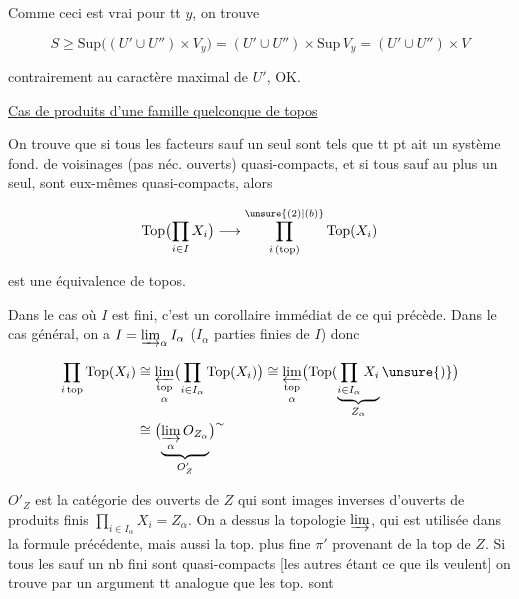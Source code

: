 Comme ceci est vrai pour tt $y$, on trouve

\[
S\geq\mathrm{Sup}\bigl((U'\cup U'')\times V_y\bigr)
 =(U'\cup U'')\times\mathrm{Sup}\,V_y=(U'\cup U'')\times V
\]

contrairement au caractère maximal de $U'$, OK.

\uline{Cas de produits  d'une famille quelconque de topos}

On trouve que si tous les facteurs sauf  un seul sont tels que tt pt ait un système fond. de voisinages (pas néc. ouverts) quasi-compacts, et si tous sauf au plus un seul, sont  eux-mêmes quasi-compacts, alors

\[
\mathrm{Top}\bigl(\prod_{i\in I}X_i\bigr)\longrightarrow\prod_{i\,(\mathrm{top})}^{\unsure{(2)|(b)}}\mathrm{Top}(X_i)
\]

est une équivalence de topos.


Dans le cas où $I$ est fini, c'est un corollaire immédiat de ce qui précède. Dans le cas général, on a $I=\varinjlim_\alpha I_\alpha$ ($I_\alpha$ parties finies de $I$) donc

\[
\begin{aligned}
\prod_{i\,\mathrm{top}}\mathrm{Top}(X_i)
 &\cong\mathop{\varprojlim_{\mathrm{top}}}_{\alpha}\bigl(\prod_{i\in I_\alpha}\mathrm{Top}(X_i)\bigr)
 \cong\mathop{\varprojlim_{\mathrm{top}}}_{\alpha}\bigl(\mathrm{Top}(\underbrace{\prod_{i\in I_\alpha}X_i}_{Z_\alpha}\unsure{)}\bigr)\\
 &\cong\bigl(\underbrace{\varinjlim_\alpha O_{Z_\alpha}}_{O'_Z}\bigr)^{\sim}
\end{aligned}
\]

$O'_Z$ est la catégorie des ouverts de $Z$  qui sont images inverses d'ouverts de produits finis $\prod_{i\in I_\alpha}X_i=Z_\alpha$.  On  a dessus la topologie  $\varinjlim$, qui  est utilisée dans la formule précédente, mais aussi la top. plus fine $\pi'$ provenant de la top de $Z$. Si tous les   sauf un nb fini sont quasi-compacts [les autres étant ce que ils veulent] on trouve par un argument tt analogue  que les top. sont

